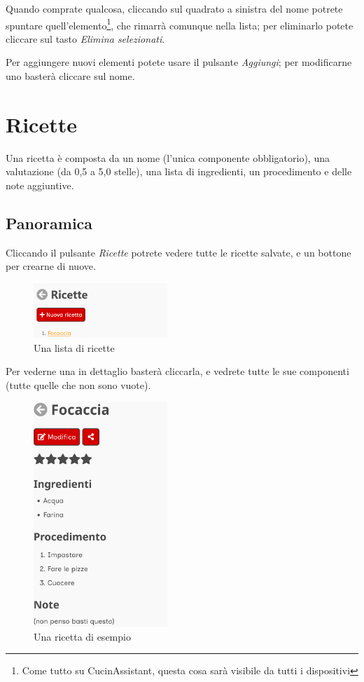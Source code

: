 \documentclass[12pt, a4paper]{report}
\begin{document}
    Quando comprate qualcosa, cliccando sul quadrato a sinistra del nome potrete spuntare quell'elemento\footnote{Come tutto su CucinAssistant,
    questa cosa sarà visibile da tutti i dispositivi}, che rimarrà comunque nella lista; per eliminarlo potete cliccare sul tasto \emph{Elimina
    selezionati}.

    Per aggiungere nuovi elementi potete usare il pulsante \emph{Aggiungi}; per modificarne uno basterà cliccare sul nome.



    \chapter{Ricette} \label{recipes}

    Una ricetta è composta da un nome (l'unica componente obbligatorio), una valutazione (da 0,5 a 5,0 stelle), una lista di ingredienti, un
    procedimento e delle note aggiuntive.

    \section{Panoramica}

    Cliccando il pulsante \emph{Ricette} potrete vedere tutte le ricette salvate, e un bottone per crearne di nuove.

    \begin{figure}[H]
        \centering
        \includegraphics[width=0.45\textwidth]{assets/it/recipes.png}
        \caption{Una lista di ricette}
    \end{figure}

    Per vederne una in dettaglio basterà cliccarla, e vedrete tutte le sue componenti (tutte quelle che non sono vuote).

    \begin{figure}[H]
        \centering
        \includegraphics[width=0.45\textwidth]{assets/it/recipe.png}
        \caption{Una ricetta di esempio}
    \end{figure}
\end{document}
